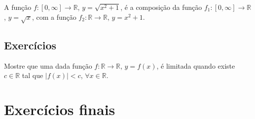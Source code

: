 \begin{ex}
  A função $f:[0, \infty]\to\mathbb{R}$, $y=\sqrt{x^2 + 1}$, é a composição da função $f_1:[0, \infty]\to\mathbb{R}$, $y = \sqrt{x}$, com a função $f_2:\mathbb{R}\to\mathbb{R}$, $y = x^2+1$.
\end{ex}

\subsection*{Exercícios}

\begin{exer}
  Mostre que uma dada função $f:\mathbb{R}\to\mathbb{R}$, $y = f(x)$, é limitada quando existe $c\in\mathbb{R}$ tal que $|f(x)|<c$, $\forall x\in\mathbb{R}$.
\end{exer}

\section{Exercícios finais}

\construirExer